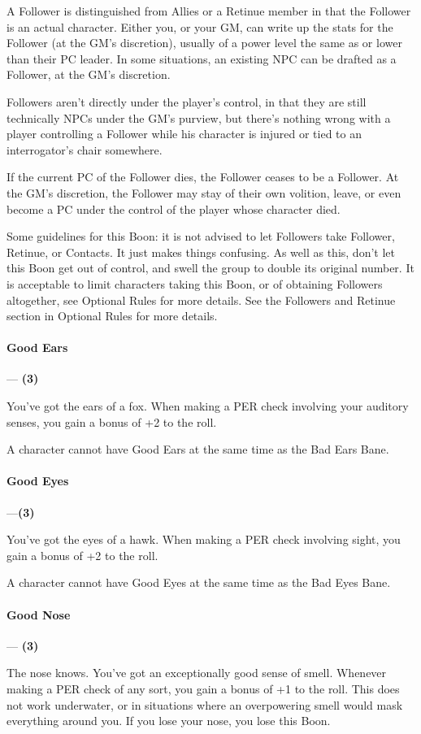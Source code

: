 \documentclass[oneside,11pt,english]{book}
\begin{document}
A Follower is distinguished from Allies or a Retinue member in that the Follower is an actual character. 
Either you, or your GM, can write up the stats for the Follower (at the GM's discretion), usually of a 
power level the same as or lower than their PC leader. In some situations, an existing NPC can be drafted 
as a Follower, at the GM's discretion. 

Followers aren't directly under the player's control, in that they are still technically NPCs under the GM's 
purview, but there's nothing wrong with a player controlling a Follower while his character is injured or 
tied to an interrogator's chair somewhere. 

If the current PC of the Follower dies, the Follower ceases to be a Follower. At the GM's discretion, the 
Follower may stay of their own volition, leave, or even become a PC under the control of the player 
whose character died. 

Some guidelines for this Boon: it is not advised to let Followers take Follower, Retinue, or Contacts. It 
just makes things confusing. As well as this, don't let this Boon get out of control, and swell the group to 
double its original number. It is acceptable to limit characters taking this Boon, or of obtaining Followers 
altogether, see Optional Rules for more details. See the Followers and Retinue section in Optional 
Rules for more details. 

\paragraph{\label{boon:Good Ears}Good Ears}---\quad\textbf{ (3) }\par
You've got the ears of a fox. When making a PER check involving your auditory senses, you gain a bonus 
of +2 to the roll. 

A character cannot have Good Ears at the same time as the Bad Ears Bane. 

\paragraph{\label{boon:Good Eyes}Good Eyes}---\quad\textbf{(3) }\par
You've got the eyes of a hawk. When making a PER check involving sight, you gain a bonus of +2 to the roll. 

A character cannot have Good Eyes at the same time as the Bad Eyes Bane. 

\paragraph{\label{boon:Good Nose}Good Nose}---\quad\textbf{ (3) }\par
The nose knows. You've got an exceptionally good sense of smell. Whenever making a PER check of any 
sort, you gain a bonus of +1 to the roll. This does not work underwater, or in situations where an 
overpowering smell would mask everything around you. If you lose your nose, you lose this Boon. 
\end{document}
